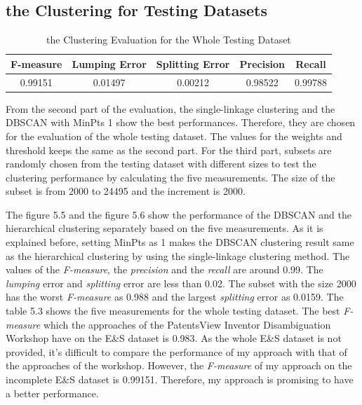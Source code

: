 \subsection{the Clustering for Testing Datasets}
\begin{table}
\centering
\begin{tabular}{|c|c|c|c|c|}
\hline
F-measure&Lumping Error&Splitting Error&Precision&Recall\\
\hline
0.99151&0.01497&0.00212&0.98522&0.99788\\
\hline
\end{tabular}
\caption{the Clustering Evaluation for the Whole Testing Dataset}
\end{table}

From the second part of the evaluation, the single-linkage clustering and the DBSCAN with MinPts 1 show the best performances. Therefore, they are chosen for the evaluation of the whole testing dataset. The values for the weights and threshold keeps the same as the second part. For the third part, subsets are randomly chosen from the testing dataset with different sizes to test the clustering performance by calculating the five measurements. The size of the subset is from 2000 to 24495 and the increment is 2000.\newline 

The figure 5.5 and the figure 5.6 show the performance of the DBSCAN and the hierarchical clustering separately based on the five measurements. As it is explained before, setting MinPts as 1 makes the DBSCAN clustering result same as the hierarchical clustering by using the single-linkage clustering method. The values of the \emph{F-measure}, the \emph{precision} and the \emph{recall} are around 0.99. The \emph{lumping} error and \emph{splitting} error are less than 0.02. The subset with the size 2000 has the worst \emph{F-measure} as 0.988 and the largest \emph{splitting} error as 0.0159. The table 5.3 shows the five measurements for the whole testing dataset.  The best \emph{F-measure} which the approaches of the PatentsView Inventor Disambiguation Workshop have on the E\&S dataset is 0.983. As the whole E\&S dataset is not provided, it's difficult to compare the performance of my approach with that of the approaches of the workshop. However, the \emph{F-measure} of my approach on the incomplete  E\&S dataset is 0.99151. Therefore, my approach is promising to have a better performance.

